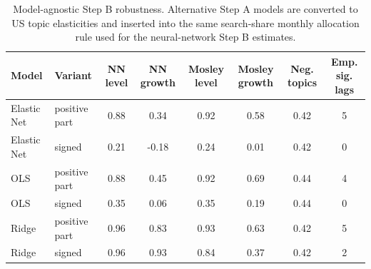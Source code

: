 \begin{table}[!htb]
\centering
\caption{Model-agnostic Step B robustness. Alternative Step A models are converted to US topic elasticities and inserted into the same search-share monthly allocation rule used for the neural-network Step B estimates.}
\label{tab:stepb_model_agnostic_elasticities}
\small
\setlength{\tabcolsep}{3pt}
\begin{tabular}{l l c c c c c c}
\toprule
Model & Variant & NN level & NN growth & Mosley level & Mosley growth & Neg. topics & Emp. sig. lags \\
\midrule
Elastic Net & positive part & 0.88 & 0.34 & 0.92 & 0.58 & 0.42 & 5 \\
Elastic Net & signed & 0.21 & -0.18 & 0.24 & 0.01 & 0.42 & 0 \\
OLS & positive part & 0.88 & 0.45 & 0.92 & 0.69 & 0.44 & 4 \\
OLS & signed & 0.35 & 0.06 & 0.35 & 0.19 & 0.44 & 0 \\
Ridge & positive part & 0.96 & 0.83 & 0.93 & 0.63 & 0.42 & 5 \\
Ridge & signed & 0.96 & 0.93 & 0.84 & 0.37 & 0.42 & 2 \\
\bottomrule
\end{tabular}
\end{table}
